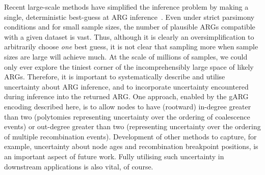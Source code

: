 \documentclass{article}
\begin{document}
Recent large-scale methods have simplified the inference problem by
making a single, deterministic best-guess at ARG
inference~\citep{kelleher2019inferring,speidel2019method,zhan2023towards}.
Even under strict parsimony conditions and for small sample sizes, the
number of plausible ARGs compatible with a given dataset is vast.
Thus, although it is clearly an oversimplification to arbitrarily
choose \emph{one} best guess, it is not clear that sampling more
when sample sizes are large will achieve much.
At the scale of millions of samples,
we could only ever explore the tiniest corner of the incomprehensibly
large space of likely ARGs.
Therefore, it is important to systematically
describe and utilise uncertainty about ARG inference, and to
incorporate uncertainty encountered during inference into the returned ARG.
One approach, enabled by the gARG encoding described here, is to allow
nodes to have (rootward) in-degree greater than two (polytomies
representing uncertainty over the ordering of coalescence events) or
out-degree greater than two (representing uncertainty over the ordering
of multiple recombination events). Development of other methods to capture, for example,
uncertainty about node ages and recombination breakpoint positions, is an important
aspect of future work. Fully utilising such uncertainty in downstream
applications is also vital, of course.
\end{document}
